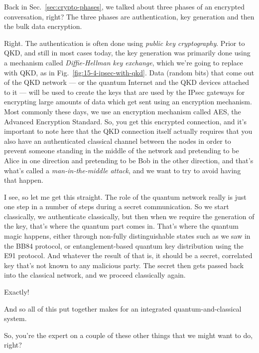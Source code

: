 \mmm Back in Sec.~\ref{sec:crypto-phases}, we talked about three phases of an encrypted conversation, right? The three phases are authentication, key generation and then the bulk data encryption.


\rrr Right. The authentication is often done using \emph{public key cryptography}. Prior to QKD, and still in most cases today, the key generation was primarily done using a mechanism called \emph{Diffie-Hellman key exchange}, which we're going to replace with QKD, as in Fig.~\ref{fig:15-4-ipsec-with-qkd}. Data (random bits) that come out of the QKD network --- or the quantum Internet and the QKD devices attached to it --- will be used to create the keys that are used by the IPsec gateways for encrypting large amounts of data which get sent using an encryption mechanism. Most commonly these days, we use an encryption mechanism called AES, the Advanced Encryption Standard. So, you get this encrypted connection, and it's important to note here that the QKD connection itself actually requires that you also have an authenticated classical channel between the nodes in order to prevent someone standing in the middle of the network and pretending to be Alice in one direction and pretending to be Bob in the other direction, and that's what's called a \emph{man-in-the-middle attack}, and we want to try to avoid having that happen.

\mmm I see, so let me get this straight. The role of the quantum network really is just one step in a number of steps during a secret communication. So we start classically, we authenticate classically, but then when we require the generation of the key, that's where the quantum part comes in. That's where the quantum magic happens, either through non-fully distinguishable states such as we saw in the BB84 protocol, or entanglement-based quantum key distribution using the E91 protocol. And whatever the result of that is, it should be a secret, correlated key that's not known to any malicious party.  The secret then gets passed back into the classical network, and we proceed classically again.

\rrr Exactly!

And so all of this put together makes for an integrated quantum-and-classical system.

So, you're the expert on a couple of these other things that we might want to do, right?

